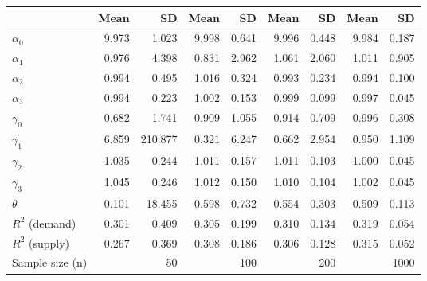 
\begin{tabular}[t]{lrrrrrrrr}
\toprule
  & Mean & SD & Mean  & SD  & Mean   & SD   & Mean    & SD   \\
\midrule
$\alpha_{0}$ & 9.973 & 1.023 & 9.998 & 0.641 & 9.996 & 0.448 & 9.984 & 0.187\\
$\alpha_{1}$ & 0.976 & 4.398 & 0.831 & 2.962 & 1.061 & 2.060 & 1.011 & 0.905\\
$\alpha_{2}$ & 0.994 & 0.495 & 1.016 & 0.324 & 0.993 & 0.234 & 0.994 & 0.100\\
$\alpha_{3}$ & 0.994 & 0.223 & 1.002 & 0.153 & 0.999 & 0.099 & 0.997 & 0.045\\
$\gamma_{0}$ & 0.682 & 1.741 & 0.909 & 1.055 & 0.914 & 0.709 & 0.996 & 0.308\\
$\gamma_{1}$ & 6.859 & 210.877 & 0.321 & 6.247 & 0.662 & 2.954 & 0.950 & 1.109\\
$\gamma_{2}$ & 1.035 & 0.244 & 1.011 & 0.157 & 1.011 & 0.103 & 1.000 & 0.045\\
$\gamma_{3}$ & 1.045 & 0.246 & 1.012 & 0.150 & 1.010 & 0.104 & 1.002 & 0.045\\
$\theta$ & 0.101 & 18.455 & 0.598 & 0.732 & 0.554 & 0.303 & 0.509 & 0.113\\
$R^{2}$ (demand) & 0.301 & 0.409 & 0.305 & 0.199 & 0.310 & 0.134 & 0.319 & 0.054\\
$R^{2}$ (supply) & 0.267 & 0.369 & 0.308 & 0.186 & 0.306 & 0.128 & 0.315 & 0.052\\
Sample size (n) &  & 50 &  & 100 &  & 200 &  & 1000\\
\bottomrule
\end{tabular}
